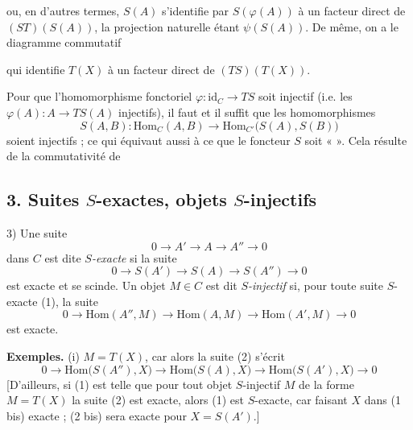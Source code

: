 \documentclass[11pt,a4paper]{article}
\begin{document}
ou, en d'autres termes, $S(A)$ s'identifie par $S(\varphi(A))$ à un facteur
direct de $(ST)(S(A))$, la projection naturelle étant $\psi(S(A))$. De même,
on a le diagramme commutatif


qui identifie $T(X)$ à un facteur direct de $(TS)(T(X))$.

Pour que l'homomorphisme fonctoriel $\varphi : \mathrm{id}_{C} \to TS$ soit
injectif (i.e. les $\varphi(A) : A \to TS(A)$ injectifs), il faut et il suffit
que les homomorphismes
\[
  S(A,B) : \mathrm{Hom}_{C}(A,B) \longrightarrow
  \mathrm{Hom}_{C'}\bigl( S(A), S(B) \bigr)
\]
soient injectifs ; ce qui équivaut aussi à ce que le foncteur $S$ soit
\struck{\ill{}} «  ». Cela résulte de la commutativité de


\subsection*{3. Suites $S$-exactes, objets $S$-injectifs}

3) Une suite
\[
  0 \longrightarrow A' \longrightarrow A \longrightarrow A'' \longrightarrow 0
  \tag{1}
\]
dans $C$ est dite \emph{$S$-exacte} si la suite
\[
  0 \longrightarrow S(A') \longrightarrow S(A) \longrightarrow S(A'')
  \longrightarrow 0
  \tag{1 bis}
\]
est exacte et se scinde. Un objet $M \in C$ est dit \emph{$S$-injectif} si,
pour toute suite $S$-exacte (1), la suite
\[
  0 \longrightarrow \mathrm{Hom}(A'', M) \longrightarrow \mathrm{Hom}(A, M)
  \longrightarrow \mathrm{Hom}(A', M) \longrightarrow 0
  \tag{2}
\]
est exacte.

\textbf{Exemples.} (i) $M = T(X)$, car alors la suite (2) s'écrit
\[
  0 \longrightarrow \mathrm{Hom}\bigl( S(A''), X \bigr) \longrightarrow
  \mathrm{Hom}\bigl( S(A), X \bigr) \longrightarrow
  \mathrm{Hom}\bigl( S(A'), X \bigr) \longrightarrow 0
  \tag{2 bis}
\]
[D'ailleurs, si (1) est telle que pour tout objet $S$-injectif $M$
\struck{\ill{}} de la forme $M = T(X)$ la suite (2) est exacte, alors (1) est
$S$-exacte, car faisant \ill{} $X$ dans (1 bis) exacte ; (2 bis) sera exacte
pour \struck{\ill{}} $X = S(A')$.]
\end{document}
